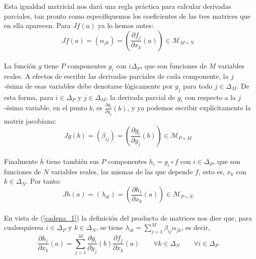 \documentclass[a4paper, 12pt]{article}
\begin{document}
\begin{enumerate}[label=\textbf{\arabic*}.]
Esta igualdad matricial nos dará una regla práctica para calcular derivadas parciales, tan pronto como especifiquemos los coeficientes de las tres matrices que en ella aparecen. Para \(Jf(a)\) ya lo hemos antes:
\[
	Jf(a) = (\alpha_{jk}) = \left( \frac{\partial f_j}{\partial x_k} (a) \right) \in \mathcal{M}_{M \times N}
\] \\

La función \(g\) tiene \(P\) componentes \(g_i\) con \(i \Delta_P\), que son funciones de \(M\) variables reales. A efectos de escribir las derivadas parciales de cada componente, la \(j\)-ésima de esas variables debe denotarse lógicamente por \(y_j\) para todo \(j \in \Delta_M\). De esta forma, para \(i \in \Delta_P\) y \(j \in \Delta_M\), la derivada parcial de \(g_i\) con respecto a la \(j\)-ésima variable, en el punto \(b\), es \(\frac{\partial g_i}{\partial y_j} (b)\), y ya podemos escribir explícitamente la matriz jacobiana:
\[
	Jg(b) = (\beta_{ij}) = \left( \frac{\partial g_i}{\partial y_j} (b) \right) \in \mathcal{M}_{P \times M}
\] \\

Finalmente \(h\) tiene también sus \(P\) componentes \(h_i = g_i \circ f\) con \(i \in \Delta_P\), que son funciones de \(N\) variables reales, las mismas de las que depende \(f\), esto es, \(x_k\) con \(k \in \Delta_N\). Por tanto:
\[
	J h(a) = (\lambda_{ik}) = \left( \frac{\partial h_i}{\partial x_k} (a) \right) \in \mathcal{M}_{P \times N}
\] \\

En vista de (\ref{cadena_1}) la definición del producto de matrices nos dice que, para cualesquierea \(i \in \Delta_P\) y \(k \in \Delta_N\), se tiene \(\lambda_{ik} = \sum_{j=1}^{M} \beta_{ij} \alpha_{jk}\), es decir,
\begin{equation}\label{cadena_3}
\frac{\partial h_i}{\partial x_k} (a) = \sum_{j=1}^{M} \frac{\partial g_i}{\partial y_j} (b) \frac{\partial f_j}{\partial x_k} (a) \qquad \forall k \in \Delta_N \qquad \forall i \in \Delta_P
\end{equation}


\end{enumerate}
\end{document}
